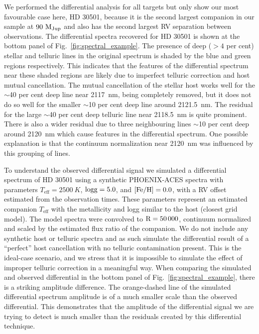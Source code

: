 \documentclass[fleqn,usenatbib]{mnras}
\begin{document}
    We performed the differential analysis for all targets but only show our most favourable case here, {HD 30501}, because it is the second largest companion in our sample at \(\rm 90~M_{Jup}\) and also has the second largest RV separation between observations. The differential spectra recovered for {HD 30501} is shown at the bottom panel of Fig.~\ref{fig:spectral_example}. The presence of deep (\(>4\) per cent) stellar and telluric lines in the original spectrum is shaded by the blue and green regions respectively. This indicates that the features of the differential spectrum near these shaded regions are likely due to imperfect telluric correction and host mutual cancellation.
    The mutual cancellation of the stellar host works well for the \(\sim\)40 per cent deep line near 2117~nm, being completely removed, but it does not do so well for the smaller \(\sim\)10 per cent deep line around 2121.5~nm. The residual for the large \(\sim\)40 per cent deep telluric line near 2118.5~nm is quite prominent. There is also a wider residual due to three neighbouring lines \(\sim\)10 per cent deep around 2120~nm which cause features in the differential spectrum. One possible explanation is that the continuum normalization near 2120~nm was influenced by this grouping of lines.

    To understand the observed differential signal we simulated a differential spectrum of {HD 30501} using a synthetic PHOENIX-ACES spectra with parameters \(T_{\textrm{eff}} = 2500~K\), \(\rm logg=5.0\), and \(\rm [Fe/H]=0.0\), with a RV offset estimated from the observation times. These parameters represent an estimated companion \(T_{\textrm{eff}}\) with the metallicity and logg similar to the host (closest grid model). The model spectra were convolved to \(\rm R=50\,000\), continuum normalized and scaled by the estimated flux ratio of the companion. We do not include any synthetic host or telluric spectra and as such simulate the differential result of a ``perfect'' host cancellation with no telluric contamination present. This is the ideal-case scenario, and we stress that it is impossible to simulate the effect of improper telluric correction in a meaningful way. When comparing the simulated and observed differential in the bottom panel of Fig.~\ref{fig:spectral_example}, there is a striking amplitude difference. The orange-dashed line of the simulated differential spectrum amplitude is of a much smaller scale than the observed differential. This demonstrates that the amplitude of the differential signal we are trying to detect is much smaller than the residuals created by this differential technique.
\end{document}
